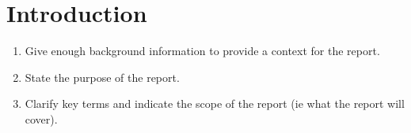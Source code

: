 \chapter{Introduction}
\begin{enumerate}
\item
Give enough background information to provide a context for the report.
\item
State the purpose of the report.
\item
Clarify key terms and indicate the scope of the report (ie what the report will cover).
\end{enumerate}